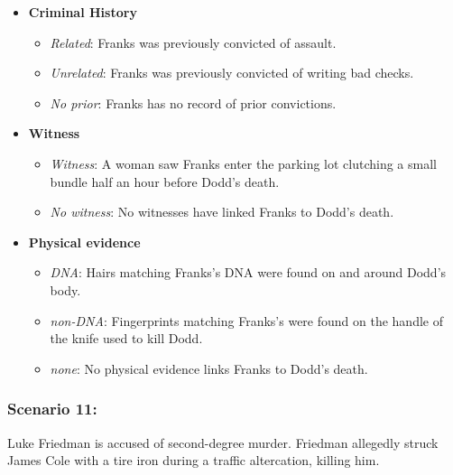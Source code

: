 \documentclass[
]{article}
\providecommand{\tightlist}{%
  \setlength{\itemsep}{0pt}\setlength{\parskip}{0pt}}
\begin{document}
\begin{itemize}
\tightlist
\item
  \textbf{Criminal History}

  \begin{itemize}
  \tightlist
  \item
    \emph{Related}: Franks was previously convicted of assault.
  \item
    \emph{Unrelated}: Franks was previously convicted of writing bad
    checks.
  \item
    \emph{No prior}: Franks has no record of prior convictions.
  \end{itemize}
\item
  \textbf{Witness}

  \begin{itemize}
  \tightlist
  \item
    \emph{Witness}: A woman saw Franks enter the parking lot clutching a
    small bundle half an hour before Dodd's death.
  \item
    \emph{No witness}: No witnesses have linked Franks to Dodd's death.
  \end{itemize}
\item
  \textbf{Physical evidence}

  \begin{itemize}
  \tightlist
  \item
    \emph{DNA}: Hairs matching Franks's DNA were found on and around
    Dodd's body.
  \item
    \emph{non-DNA}: Fingerprints matching Franks's were found on the
    handle of the knife used to kill Dodd.
  \item
    \emph{none}: No physical evidence links Franks to Dodd's death.
  \end{itemize}
\end{itemize}

\hypertarget{scenario-11}{%
\subsubsection{Scenario 11:}\label{scenario-11}}

Luke Friedman is accused of second-degree murder. Friedman allegedly
struck James Cole with a tire iron during a traffic altercation, killing
him.
\end{document}
